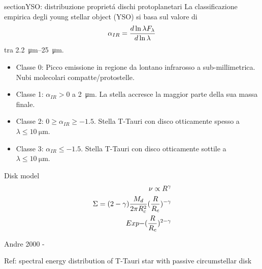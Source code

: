 \begin{workout}
section{YSO: distribuzione propriet\'a dischi protoplanetari}
La classificazione empirica degli young stellar object (YSO) si basa sul valore di
\begin{equation}
\alpha_{IR}=\frac{d \ln{\lambda F_{\lambda}}}{d \ln{\lambda}}
\end{equation}
tra \SIrange{2.2}{25}{\micro\meter}.
\begin{itemize}
\item Classe 0: Picco emissione in regione da lontano infrarosso a sub-millimetrica. Nubi molecolari compatte/protostelle.
\item Classe 1: $\alpha_{IR}>0$ a \SI{2}{\micro\meter}. La stella accresce la maggior parte della sua massa finale.
\item Classe 2: $0\geq\alpha_{IR}\geq-1.5$. Stella T-Tauri con disco otticamente spesso a $\lambda\leq\SI{10}{\micro\meter}$.
\item Classe 3: $\alpha_{IR}\leq-1.5$. Stella T-Tauri con disco otticamente sottile a $\lambda\leq\SI{10}{\micro\meter}$.
\end{itemize}
\end{workout}

\begin{workout}
Disk model
\begin{align}
\nu\propto R^{\gamma}\\
\Sigma=(2-\gamma)\frac{M_d}{2\pi R_c^2}(\frac{R}{R_c})^{-\gamma}\\Exp{-(\frac{R}{R_c})^{2-\gamma}}
\end{align}
\end{workout}


\begin{workout}
Andre 2000 - 
\end{workout}

\begin{workout}
Ref: spectral energy distribution of T-Tauri star with passive circumstellar disk
\end{workout}

